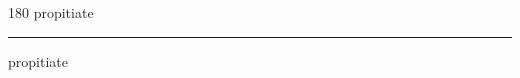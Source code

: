 
\begin{frame}
\begin{center}
\begin{turn}{180}
{\fontsize{2.5cm}{1em}\selectfont propitiate}
\end{turn}
\vspace{1em}\par  
\hrule
\vspace{1em}\par  
{\fontsize{2.5cm}{1em}\selectfont propitiate}
\end{center}
\end{frame}
